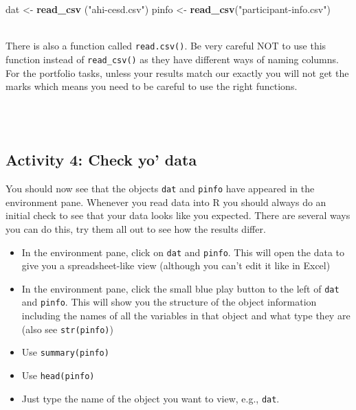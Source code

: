 \documentclass[]{book}
\newenvironment{Shaded}{\begin{snugshade}}{\end{snugshade}}
\newcommand{\KeywordTok}[1]{\textcolor[rgb]{0.13,0.29,0.53}{\textbf{#1}}}
\newcommand{\NormalTok}[1]{#1}
\newcommand{\StringTok}[1]{\textcolor[rgb]{0.31,0.60,0.02}{#1}}
\providecommand{\tightlist}{%
  \setlength{\itemsep}{0pt}\setlength{\parskip}{0pt}}
\newenvironment{danger}
    {
    \hline\\
    }
    { 
    \\\\\hline
    }
\begin{document}
\begin{Shaded}
\begin{Highlighting}[]
\NormalTok{dat <-}\StringTok{ }\KeywordTok{read_csv}\NormalTok{ (}\StringTok{"ahi-cesd.csv"}\NormalTok{)}
\NormalTok{pinfo <-}\StringTok{ }\KeywordTok{read_csv}\NormalTok{(}\StringTok{"participant-info.csv"}\NormalTok{)}
\end{Highlighting}
\end{Shaded}

\begin{danger}
There is also a function called \texttt{read.csv()}. Be very careful NOT
to use this function instead of \texttt{read\_csv()} as they have
different ways of naming columns. For the portfolio tasks, unless your
results match our exactly you will not get the marks which means you
need to be careful to use the right functions.
\end{danger}

\hypertarget{activity-4-check-yo-data}{%
\subsection{Activity 4: Check yo' data}\label{activity-4-check-yo-data}}

You should now see that the objects \texttt{dat} and \texttt{pinfo} have appeared in the environment pane. Whenever you read data into R you should always do an initial check to see that your data looks like you expected. There are several ways you can do this, try them all out to see how the results differ.

\begin{itemize}
\tightlist
\item
  In the environment pane, click on \texttt{dat} and \texttt{pinfo}. This will open the data to give you a spreadsheet-like view (although you can't edit it like in Excel)\\
\item
  In the environment pane, click the small blue play button to the left of \texttt{dat} and \texttt{pinfo}. This will show you the structure of the object information including the names of all the variables in that object and what type they are (also see \texttt{str(pinfo)})
\item
  Use \texttt{summary(pinfo)}
\item
  Use \texttt{head(pinfo)}
\item
  Just type the name of the object you want to view, e.g., \texttt{dat}.
\end{itemize}
\end{document}
